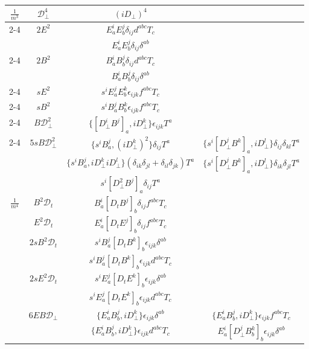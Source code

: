 \documentclass[prd,onecolumn, nofootinbib, 11pt]{revtex4}
\newcommand{\iD}{iD_\perp}
\newcommand{\D}{D_\perp}
\begin{document}
\begin{table}[h!]
{\begin{tabular}{| c | c | c | c |}
\multirow{12}{*}{$\frac{1}{m^3}$} & $\mathcal{D}_\perp^4$  & $(\iD)^4$  & \\ \cline{2-4} 
					        &  \multirow{2}{*}{$2E^2$} & $E^i_a E^j_b \delta_{ij} d^{abc} T_c $ &   \\ 
					        					     & & $E^i_a E^j_b \delta_{ij} \delta^{ab}$ & \\ \cline{2-4}	
					        	&  \multirow{2}{*}{$2B^2$} & $B^i_a B^j_b \delta_{ij} d^{abc} T_c $ &   \\ 
					        					     & & $B^i_a B^j_b \delta_{ij} \delta^{ab}$ & \\ \cline{2-4}	
						& $sE^2$ & $s^i E^j_a E^k_b \epsilon_{ijk} f^{abc}T_c$ &  \\	\cline{2-4}	
						& $sB^2$ & $s^i B^j_a B^k_b \epsilon_{ijk} f^{abc}T_c$ &  \\	\cline{2-4}	
						& $B\mathcal{D}_\perp^2$ & $\{ [\D^i B^j]_a, \iD^k \}\epsilon_{ijk}T^a$ &  \\	\cline{2-4}	
						& \multirow{3}{*}{$5sB \mathcal{D}_\perp^2$} & $\{ s^iB^j_a,(\iD^k)^2 \} \delta_{ij}T^a$ & $\{ s^i [\D^j B^k]_a, \iD^l \} \delta_{ij}\delta_{kl}T^a$  \\ 	
												   & & $\{ s^iB^j_a,\iD^k \iD^l \} (\delta_{ik}\delta_{jl} +\delta_{il}\delta_{jk} )T^a$  & $\{ s^i [\D^j B^k]_a, \iD^l \} \delta_{ik}\delta_{jl}T^a$  \\ 
												   & &  $s^i [\D^2 B^j]_a \delta_{ij}T^a$ &  \\ \hline \hline		
\multirow{30}{*}{$\frac{1}{m^4}$}	& $B^2\mathcal{D}_t$ & $B_a^i[D_t B^j]_b\delta_{ij} f^{abc}T_c$ & \\  \cline{2-4}
						& $E^2\mathcal{D}_t$ & $E_a^i[D_t E^j]_b\delta_{ij}f^{abc}T_c$ &    \\  \cline{2-4}
						& \multirow{2}{*}{$2sB^2 \mathcal{D}_t$}  &  $s^i  B^j_a [D_t B^k]_b \epsilon_{ijk}\delta^{ab}$ &   \\  
										     	     & &  $s^i  B^j_a [D_t B^k]_b \epsilon_{ijk} d^{abc}T_c$  & \\ \cline{2-4}
						& \multirow{2}{*}{$2sE^2 \mathcal{D}_t$}  &  $s^i  E^j_a [D_t E^k]_b \epsilon_{ijk}\delta^{ab}$ & \\  
										     	     & &  $s^i  E^j_a [D_t E^k]_b \epsilon_{ijk}d^{abc}T_c$ & \\ \cline{2-4}	
						& \multirow{3}{*}{$6EB\mathcal{D}_\perp$}  & $\{ E^i_a B^j_b, \iD^k\}\epsilon_{ijk}\delta^{ab}$ & $\{ E^i_a B^j_b, \iD^k\}\epsilon_{ijk}f^{abc}T_c$ \\   
												& & $\{ E^i_a B^j_b, \iD^k\}\epsilon_{ijk}d^{abc}T_c$ & $E^i_a [\D^j B_b^k]_b\epsilon_{ijk}\delta^{ab}$ \\

\end{tabular}}
\end{table}
\end{document}
